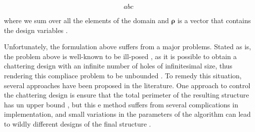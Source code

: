 \documentclass[../main.tex]{subfiles}
\begin{document}
\begin{equation}
  abc
  \label{eq:stiffness}
\end{equation}

where we sum over all the elements of the domain and $\bm{\rho}$ is a vector that contains the design variables \cite{lazarovFiltersTopologyOptimization2011}. 

Unfortunately, the formulation above suffers from a major problems. Stated as is, the problem above is well-known to be ill-posed , as it is possible to obtain a chattering design with an infinite number of holes of infinitesimal size, thus rendering this compliace problem to be unbounded \cite{liuEfficient3DTopology2014}. To remedy this situation, several approaches have been proposed in the literature. One approach to control the chattering design is ensure that the total perimeter of the resulting structure has un upper bound \cite{haberNewApproachVariabletopology1996} \cite{Jog 2002}, but this e method suffers from several complications in implementation, and small variations in the parameters of the algorithm can lead to wildly different designs of the final structure \cite{Jog 2002}.
\end{document}
